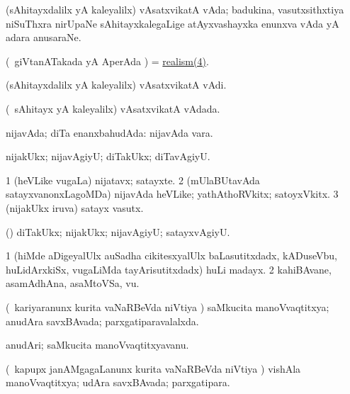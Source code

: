 \bentry
{} 
\gl{\nA}
\expl{}
\bmng
 (sAhitayxdalilx yA kaleyalilx) vAsatxvikatA vAda; badukina, vasutxsithxtiya niSuThxra nirUpaNe sAhitayxkalegaLige atAyxvashayxka enunxva vAda yA adara anusaraNe. 
\emng
\eentry

\bentry
{} 
\gl{\nA}
\bmng
 (\kanmu\ giVtanATakada yA AperAda \vi) = \hyperref{kandict_r.pdf}{R}{realism(4)}{realism(4)}. 
\emng
\eentry

\bentry
{} 
\gl{\nA}
\expl{}
\bmng
 (sAhitayxdalilx yA kaleyalilx) vAsatxvikatA vAdi. 
\emng
\eentry

\bentry
{} 
\gl{\gu}
\expl{}
\bmng
 (\sA\ sAhitayx yA kaleyalilx) vAsatxvikatA vAdada. 
\emng
\eentry

\bentry
{} 
\gl{\gu}
\expl{}
\bmng
 nijavAda; diTa enanxbahudAda:  nijavAda vara. 
\emng
\eentry

\bentry
{} 
\gl{\kirxvi}
\expl{}
\bmng
 nijakUkx; nijavAgiyU; diTakUkx; diTavAgiyU. 
\emng
\eentry

\bentry
{} 
\gl{\nA}
\bmng
\bnum
\num{1} (heVLike \mo vugaLa) nijatavx; satayxte. 
\num{2} (mUlaBUtavAda satayxvanonxLagoMDa) nijavAda heVLike; yathAthoRVkitx; satoyxVkitx. 
\num{3} (nijakUkx iruva) satayx vasutx. 
\enum
\emng

\noindent 
\gl{\pagu}
\expl{}
\bmng
{} (\pArxparx) diTakUkx; nijakUkx; nijavAgiyU; satayxvAgiyU. 
\emng
\eentry

\bentry
{} 
\gl{\nA}
\expl{}
\bmng
\bnum
\num{1} (hiMde aDigeyalUlx auSadha cikitesxyalUlx baLasutitxdadx, kADuseVbu, huLidArxkiSx, \mo vugaLiMda tayArisutitxdadx) huLi madayx. 
\num{2} kahiBAvane, asamAdhAna, asaMtoVSa, \mo vu. 
\enum
\emng
\eentry

\bentry 
{} 
\gl{\gu}
\expl{\SAfr\ }
\bmng
(\kanmu\ kariyaranunx kurita vaNaRBeVda niVtiya \vi) saMkucita manoVvaqtitxya; anudAra savxBAvada; parxgatiparavalalxda. 
\emng
\eentry

\bentry 
{} 
\gl{\nA}
\expl{\SAfr}
\bmng
anudAri; saMkucita manoVvaqtitxyavanu. 
\emng
\eentry

\bentry
{} 
\gl{\gu}
\expl{\SAfr}
\bmng
(\kanmu\ kapupx janAMgagaLanunx kurita vaNaRBeVda niVtiya \vi) vishAla manoVvaqtitxya; udAra savxBAvada; parxgatipara. 
\emng
\eentry

